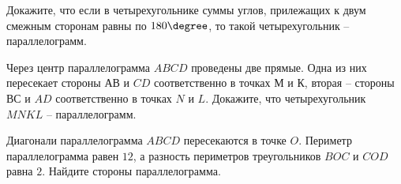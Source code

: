 \begin{homework}[number=2]
	\begin{listofex}
		\item \begin{enumcols}[itemcolumns=2]
			\item {}
			\item {}
			\item {}
			\item {}
		\end{enumcols}
		\item Докажите, что если в четырехугольнике суммы углов, прилежащих к двум смежным сторонам равны по \( 180\degree \), то такой четырехугольник -- параллелограмм.
		\item Через центр параллелограмма \( ABCD \) проведены две прямые. Одна из них пересекает стороны \( АВ \) и \( CD \) соответственно в точках \( М \) и \( К \), вторая -- стороны \( ВС \) и \( AD \) соответственно в точках \( N \) и \( L \). Докажите, что четырехугольник \( MNKL \) -- параллелограмм.
		\item Диагонали параллелограмма \( ABCD \) пересекаются в точке \( O \). Периметр параллелограмма равен \( 12 \), а разность периметров треугольников \( BOC \) и \( COD \) равна \( 2 \). Найдите стороны параллелограмма.
		
		\item {}
		\item {}
	\end{listofex}
\end{homework}
%
